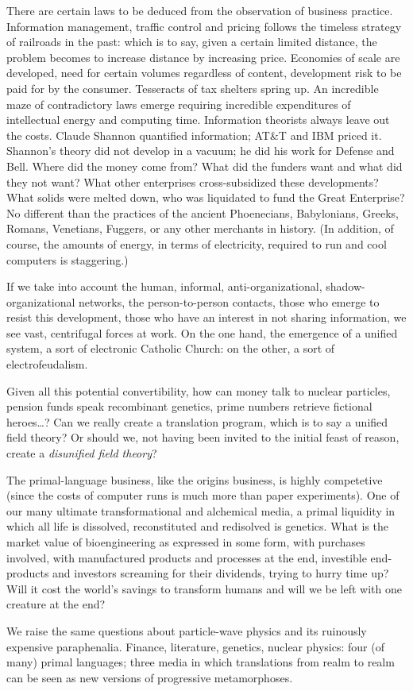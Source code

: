 There are certain laws to be deduced from the observation of business practice. Information
management, traffic control and
pricing follows the timeless strategy of railroads in the past: which is to say, given a
certain limited distance, the problem becomes to increase distance by increasing price.
Economies of scale are developed, need for certain volumes regardless of content, development risk to be paid for by the consumer.
Tesseracts of tax shelters spring up. An incredible maze of contradictory laws emerge
requiring incredible expenditures of intellectual energy and computing time.
Information theorists always leave out the costs.
Claude Shannon quantified information;
AT\&T and IBM priced it. Shannon's theory did not develop in a vacuum; he did his work
for Defense and Bell. Where did the money come from? What did the funders want and
what did they not want? What other enterprises cross-subsidized these developments?
What solids were melted down, who was liquidated to fund the Great Enterprise? No
different than the practices of the ancient Phoenecians, Babylonians, Greeks, Romans,
Venetians, Fuggers, or any other merchants in history. (In addition, of course, the amounts
of energy, in terms of electricity, required to run and cool computers is staggering.)

If we take into account the human, informal, anti-organizational, shadow-organizational networks,
the person-to-person
contacts, those who emerge to resist this development,
those who have an interest in not
sharing information, we see vast, centrifugal
forces at work. On the one hand, the emergence of a unified system, a sort of electronic
Catholic Church: on the other, a sort of
electrofeudalism.

Given all this potential convertibility,
how can money talk to nuclear particles,
pension funds speak recombinant genetics,
prime numbers retrieve fictional heroes\ldots ?
Can we really create a translation program,
which is to say a unified field theory? Or
should we, not having been invited to the
initial feast of reason, create a \emph{disunified field theory}?

The primal-language business, like the
origins business, is highly competetive (since
the costs of computer runs is much more
than paper experiments). One of our many
ultimate transformational and alchemical
media, a primal liquidity in which all life is
dissolved, reconstituted and redisolved is
genetics. What is the market value of bioengineering as expressed in some form, with
purchases involved, with manufactured products and processes at the end, investible
end-products and investors screaming for
their dividends, trying to hurry time up?
Will it cost the world's savings to transform
humans and will we be left with one creature
at the end?

We raise the same questions about particle-wave physics and its ruinously expensive paraphenalia.
Finance, literature, genetics, nuclear physics: four (of many) primal languages; three
media in which translations from realm to realm can be seen as new versions of progressive metamorphoses.

